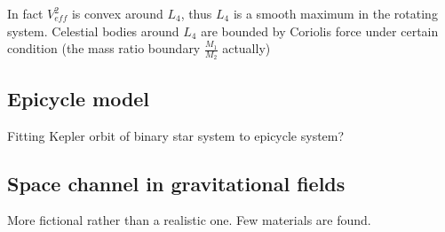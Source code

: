 	In fact $V_{eff}^2$ is convex around $L_4$, thus $L_4$ is a smooth maximum in the rotating system. Celestial bodies around $L_4$ are bounded by Coriolis force under certain condition (the mass ratio boundary $\frac{M_1}{M_2}$ actually)

\subsection{\label{sec:Epicycle}Epicycle model}

	Fitting Kepler orbit of binary star system to epicycle system?

\subsection{\label{sec:Channel}Space channel in gravitational fields}

	More fictional rather than a realistic one. Few materials are found.